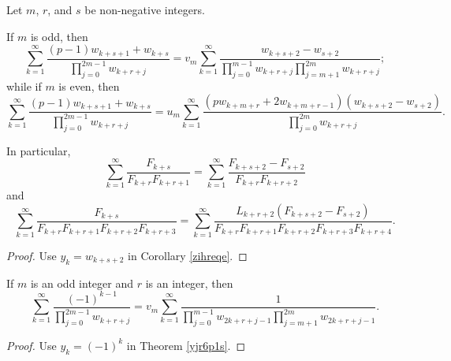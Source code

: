 \documentclass[12pt,reqno]{article}
\begin{document}
\begin{proposition}
	Let $m$, $r$, and $s$ be non-negative integers. 
	
	If $m$ is odd, then
		\begin{equation}
		\sum_{k = 1}^\infty  {\frac{{(p-1)w_{k + s+1} + w_{k+s} }}{{\prod\limits_{j = 0}^{2m - 1} {w_{k + r + j} } }}}  = v_m \sum_{k = 1}^\infty  {\frac{{ {w_{k + s + 2}  - w_{s + 2} } }}{{\prod\limits_{j = 0}^{m - 1} {w_{k + r + j} } \prod\limits_{j = m + 1}^{2m} {w_{k + r + j} } }}} ;
		\end{equation}
	while if $m$ is even, then
		\begin{equation*}
		\sum_{k = 1}^\infty  {\frac{{(p-1)w_{k + s+1}+w_{k+s}}}{{\prod\limits_{j = 0}^{2m - 1} {w_{k + r + j} } }}}  = u_m\sum_{k = 1}^\infty  {\frac{{ \left( {p w_{k + m + r}  + 2 w_{k + m + r - 1} } \right)\left( {w_{k + s + 2}  - w_{s + 2} } \right)}}{\prod\limits_{j = 0}^{2m} w_{k + r + j} }} .
		\end{equation*}
	
	In particular,
		\begin{equation*}
		\sum_{k = 1}^\infty  {\frac{{F_{k + s} }}{{F_{k + r} F_{k + r + 1} }}}  = \sum_{k = 1}^\infty  {\frac{{F_{k + s + 2}  - F_{s + 2} }}{{F_{k + r} F_{k + r + 2} }}}  
		\end{equation*}
	and
		\begin{equation*}
		\sum_{k = 1}^\infty  \frac{{F_{k + s} }}{{F_{k + r} F_{k + r + 1} F_{k + r + 2} F_{k + r + 3} }}  = \sum_{k = 1}^\infty  \frac{ L_{k + r + 2}( {F_{k + s + 2}  - F_{s + 2} } )}{F_{k + r} F_{k + r + 1} F_{k + r + 2}F_{k + r + 3}F_{k + r + 4}} .
		\end{equation*}
\end{proposition}
\begin{proof}
	Use $y_k=w_{k+s+2}$ in Corollary \ref{zihreqe}.
\end{proof}
\begin{proposition}
	If $m$ is an odd integer and $r$ is an integer, then
	\begin{equation*}
		\sum_{k = 1}^\infty  {\frac{{( - 1)^{k - 1} }}{{\prod\limits_{j = 0}^{2m - 1} {w_{k + r + j} } }}}  = v_m \sum_{k = 1}^\infty\frac{{1 }}{{\prod\limits_{j = 0}^{m - 1} {w_{2k  + r + j - 1} } \prod\limits_{j = m + 1}^{2m} {w_{2k  + r + j - 1} } }}.
		\end{equation*}
\end{proposition}
\begin{proof}	Use $y_k=(-1)^k$ in Theorem \ref{yjr6p1s}.
\end{proof}
\end{document}
